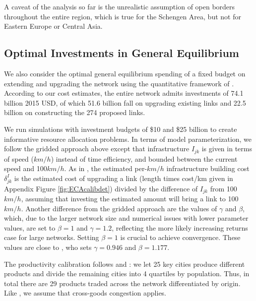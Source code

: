 \documentclass[a4paper]{article}
\begin{document}
A caveat of the analysis so far is the unrealistic assumption of open borders throughout the entire region, which is true for the Schengen Area, but not for Eastern Europe or Central Asia. %

\subsection{Optimal Investments in General Equilibrium}

We also consider the optimal general equilibrium spending of a fixed budget on extending and upgrading the network using the quantitative framework of \citet{fajgelbaum2020optimal}. According to our cost estimates, the entire network admits investments of 74.1 billion 2015 USD, of which 51.6 billion fall on upgrading existing links and 22.5 billion on constructing the 274 proposed links. \newline 

We run simulations with investment budgets of \$10 and \$25 billion to create informative resource allocation problems. In terms of model parameterization, we follow the gridded approach above except that infrastructure $I_{jk}$ is given in terms of speed ($km/h$) instead of time efficiency, and bounded between the current speed and 100$km/h$. As in \citet{krantz2024optimal}, the estimated per-$km/h$ infrastructure building cost $\delta^I_{jk}$ is the estimated cost of upgrading a link (length times cost/km given in Appendix Figure \ref{fig:ECAcalibdet}) divided by the difference of $I_{jk}$ from 100$km/h$, assuming that investing the estimated amount will bring a link to 100$km/h$. Another difference from the gridded approach are the values of $\gamma$ and $\beta$, which, due to the larger network size and numerical issues with lower parameter values, are set to $\beta = 1$ and $\gamma = 1.2$, reflecting the more likely increasing returns case for large networks. Setting $\beta = 1$ is crucial to achieve convergence. These values are close to \citet{graff2024spatial}, who sets $\gamma = 0.946$ and $\beta = 1.177$. \newline 

The productivity calibration follows \citet{armington1969theory} and \citet{fajgelbaum2020optimal}: we let 25 key cities produce different products and divide the remaining cities into 4 quartiles by population. Thus, in total there are 29 products traded across the network differentiated by origin. Like \citet{fajgelbaum2020optimal}, we assume that cross-goods congestion applies. \newline 
\end{document}
